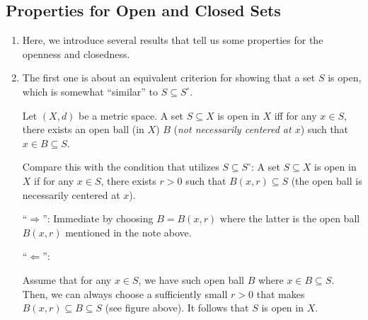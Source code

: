 \subsection{Properties for Open and Closed Sets}
\begin{enumerate}
\item Here, we introduce several results that tell us some properties for the
openness and closedness.
\item The first one is about an equivalent criterion for showing that a set
\(S\) is open, which is somewhat ``similar'' to \(S\subseteq S^{\circ}\).
\begin{proposition}
\label{prp:open-set-exist-open-ball}
Let \((X,d)\) be a metric space. A set \(S\subseteq X\) is open in \(X\) iff
for any \(x\in S\), there exists an open ball (in \(X\)) \(B\) (\emph{not
necessarily centered at \(x\)}) such that \(x\in B\subseteq S\).

\begin{note}
Compare this with the condition that utilizes \(S\subseteq S^{\circ}\): A set
\(S\subseteq X\) is open in \(X\) if for any \(x\in S\), there exists \(r>0\)
such that \(B(x,r)\subseteq S\) (the open ball is necessarily centered at \(x\)).
\end{note}

\begin{pf}
``\(\Rightarrow\)'': Immediate by choosing \(B=B(x,r)\) where the latter is the
open ball \(B(x,r)\) mentioned in the note above.

``\(\Leftarrow\)'': 
\begin{center}
\end{center}
Assume that for any \(x\in S\), we have such open ball \(B\) where \(x\in
B\subseteq S\). Then, we can always choose a sufficiently small \(r>0\) that
makes \(B(x,r)\subseteq B\subseteq S\) (see figure above). It follows that
\(S\) is open in \(X\).
\end{pf}
\end{proposition}


\end{enumerate}
